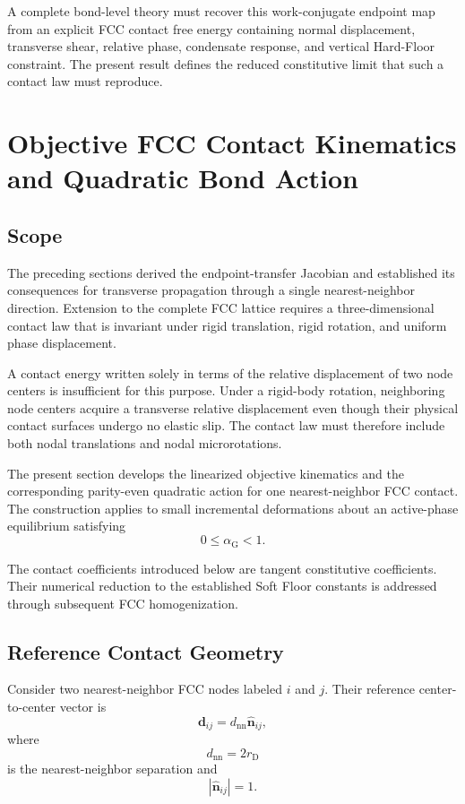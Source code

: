 A complete bond-level theory must recover this work-conjugate endpoint map from an explicit FCC contact free energy containing normal displacement, transverse shear, relative phase, condensate response, and vertical Hard-Floor constraint. The present result defines the reduced constitutive limit that such a contact law must reproduce.

\section{Objective FCC Contact Kinematics and Quadratic Bond Action}

\subsection{Scope}

The preceding sections derived the endpoint-transfer Jacobian and established its consequences for transverse propagation through a single nearest-neighbor direction. Extension to the complete FCC lattice requires a three-dimensional contact law that is invariant under rigid translation, rigid rotation, and uniform phase displacement.

A contact energy written solely in terms of the relative displacement of two node centers is insufficient for this purpose. Under a rigid-body rotation, neighboring node centers acquire a transverse relative displacement even though their physical contact surfaces undergo no elastic slip. The contact law must therefore include both nodal translations and nodal microrotations.

The present section develops the linearized objective kinematics and the corresponding parity-even quadratic action for one nearest-neighbor FCC contact. The construction applies to small incremental deformations about an active-phase equilibrium satisfying
\begin{equation}
    0 \leq \alpha_{\mathrm{G}} < 1.
\end{equation}

The contact coefficients introduced below are tangent constitutive coefficients. Their numerical reduction to the established Soft Floor constants is addressed through subsequent FCC homogenization.

\subsection{Reference Contact Geometry}

Consider two nearest-neighbor FCC nodes labeled $i$ and $j$. Their reference center-to-center vector is
\begin{equation}
    \mathbf{d}_{ij} = d_{\mathrm{nn}}\hat{\mathbf{n}}_{ij},
\end{equation}
where
\begin{equation}
    d_{\mathrm{nn}} = 2r_{\mathrm{D}}
\end{equation}
is the nearest-neighbor separation and
\begin{equation}
    \left| \hat{\mathbf{n}}_{ij} \right| = 1.
\end{equation}

